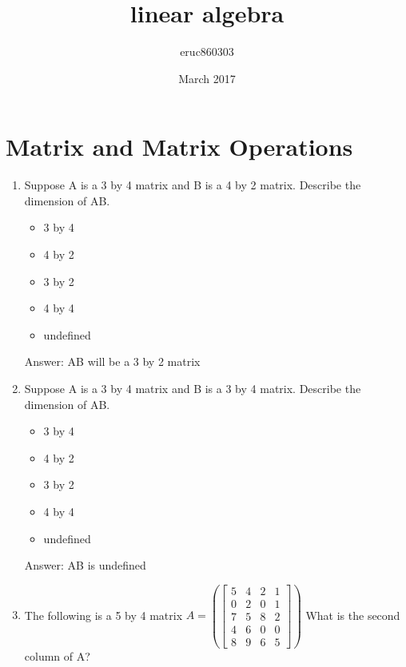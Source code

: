 \documentclass{article}
\title{linear algebra}
\author{eruc860303 }
\date{March 2017}
\begin{document}
\maketitle


\section{Matrix and Matrix Operations}

\begin{enumerate}
    \item Suppose A is a 3 by 4 matrix and B is a 4 by 2 matrix.
        Describe the dimension of AB.
        
        \begin{itemize}
            \item 3 by 4
            \item 4 by 2
            \item 3 by 2
            \item 4 by 4
            \item undefined
        \end{itemize}   
        
        Answer: AB will be a 3 by 2 matrix
        
        \item Suppose A is a 3 by 4 matrix and B is a 3 by 4 matrix.
        Describe the dimension of AB.
        
        \begin{itemize}
            \item 3 by 4
            \item 4 by 2
            \item 3 by 2
            \item 4 by 4
            \item undefined
        \end{itemize}   
        
        Answer: AB is undefined

    \item The following is a 5 by 4 matrix
        $A = \left( \begin{bmatrix} 5 & 4& 2 & 1 \\ 0 & 2& 0 & 1\\ 7 & 5& 8 & 2\\ 4 & 6& 0 & 0\\ 8 & 9& 6 & 5 \end{bmatrix} \right)$
        What is the second column of A?
        

\end{enumerate}
\end{document}
